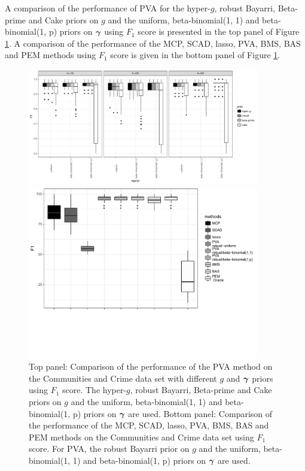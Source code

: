 A comparison of the performance of PVA for the hyper-$g$, robust Bayarri,
Beta-prime and Cake priors on $g$ and the uniform, beta-binomial(1, 1) and
beta-binomial(1, p) priors on ${\boldsymbol \gamma}$ using $F_1$ score is presented in
the top panel of Figure \ref{fig:commPVA_F1}. A comparison of the performance of the MCP, SCAD,
lasso, PVA, BMS, BAS and PEM  methods using $F_1$ score is given in the bottom panel
of Figure
\ref{fig:commPVA_F1}.

\begin{figure}[p!]
	\begin{center}	
		\includegraphics[width=0.9\textwidth]{./commPVA_F1.pdf}  
		
		\includegraphics[trim={0 4cm 0 0},width=0.9\textwidth]{./commPVA_F1_compare_edit.pdf} 
	\end{center}
	\caption{Top panel: Comparison of the performance of the PVA method on the
						Communities and Crime data set with different $g$ and ${\boldsymbol \gamma}$ priors using $F_1$ score.
						The hyper-$g$,
						robust Bayarri, Beta-prime and Cake priors on $g$ and the uniform, beta-binomial(1, 1) and beta-binomial(1, p) priors on ${\boldsymbol \gamma}$ are used.
			Bottom panel: Comparison of the performance of the MCP, SCAD, lasso, PVA, BMS, BAS and PEM methods on the
			Communities and Crime data set using $F_1$ score. For PVA, the
			robust Bayarri prior on $g$ and the uniform, beta-binomial(1, 1) and beta-binomial(1, p) priors
			on ${\boldsymbol \gamma}$ are used.		}
	\label{fig:commPVA_F1}
\end{figure}

